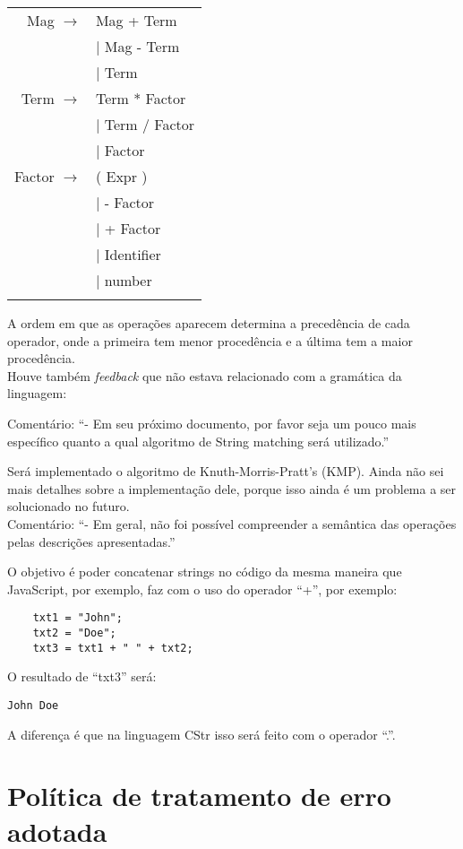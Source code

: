 \documentclass[12pt]{article}
\begin{document}
\begin{longtable}{ r l }
	Mag				$\rightarrow$ 	& Mag + Term \\
									& $|$ Mag - Term \\
									& $|$ Term \\
	Term			$\rightarrow$ 	& Term * Factor \\
									& $|$ Term / Factor \\
									& $|$ Factor \\
	Factor			$\rightarrow$ 	& ( Expr ) \\
									& $|$  - Factor \\
									& $|$  + Factor \\
									& $|$  Identifier \\
									& $|$  number \\ \\
\end{longtable}
		

A ordem em que as operações aparecem determina a precedência de cada operador, onde a primeira tem menor procedência e a última tem a maior procedência.\\

Houve também \textit{feedback} que não estava relacionado com a gramática da linguagem:

Comentário: ``- Em seu próximo documento, por favor seja um pouco mais específico quanto a qual algoritmo de String matching será utilizado.''

Será implementado o algoritmo de Knuth-Morris-Pratt’s (KMP). Ainda não sei mais detalhes sobre a implementação dele, porque isso ainda é um problema a ser solucionado no futuro.\\

Comentário: ``- Em geral, não foi possível compreender a semântica das operações pelas descrições apresentadas.''

O objetivo é poder concatenar strings no código da mesma maneira que JavaScript, por exemplo, faz com o uso do operador ``+'', por exemplo:

\begin{verbatim}
	txt1 = "John";
	txt2 = "Doe";
	txt3 = txt1 + " " + txt2;
\end{verbatim}
O resultado de ``txt3'' será:
\begin{verbatim}
John Doe
\end{verbatim}

A diferença é que na linguagem CStr isso será feito com o operador ``.''.

\section{Política de tratamento de erro adotada}
\end{document}
